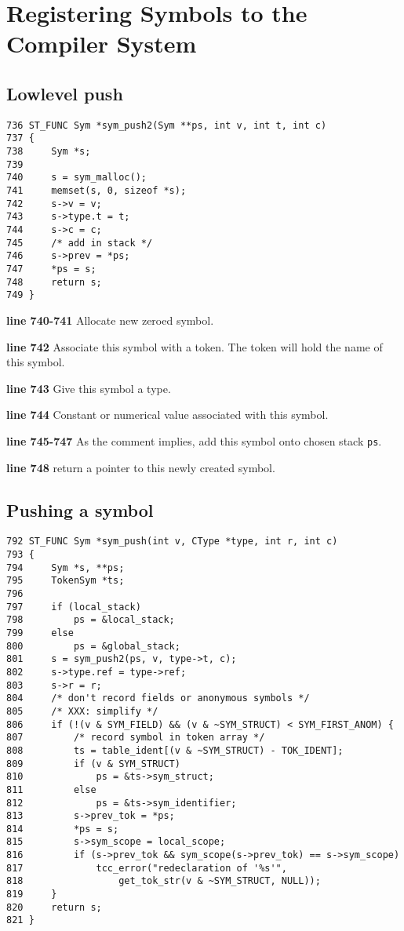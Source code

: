 \section{Registering Symbols to the Compiler System}

\subsection{Lowlevel push}
\begin{verbatim}
736 ST_FUNC Sym *sym_push2(Sym **ps, int v, int t, int c)
737 {
738     Sym *s;
739
740     s = sym_malloc();
741     memset(s, 0, sizeof *s);
742     s->v = v;
743     s->type.t = t;
744     s->c = c;
745     /* add in stack */
746     s->prev = *ps;
747     *ps = s;
748     return s;
749 }
\end{verbatim}
\begin{tcc_desc}
\textbf{line 740-741} Allocate new zeroed symbol. 

\textbf{line 742} Associate this symbol with a token. The token will hold the name of this symbol.

\textbf{line 743} Give this symbol a type.

\textbf{line 744} Constant or numerical value associated with this symbol.

\textbf{line 745-747} As the comment implies, add this symbol onto chosen stack \verb|ps|.

\textbf{line 748} return a pointer to this newly created symbol.
\end{tcc_desc}

\subsection{Pushing a symbol}

\begin{verbatim}
792 ST_FUNC Sym *sym_push(int v, CType *type, int r, int c)
793 {
794     Sym *s, **ps;
795     TokenSym *ts;
796
797     if (local_stack)
798         ps = &local_stack;
799     else
800         ps = &global_stack;
801     s = sym_push2(ps, v, type->t, c);
802     s->type.ref = type->ref;
803     s->r = r;
804     /* don't record fields or anonymous symbols */
805     /* XXX: simplify */
806     if (!(v & SYM_FIELD) && (v & ~SYM_STRUCT) < SYM_FIRST_ANOM) {
807         /* record symbol in token array */
808         ts = table_ident[(v & ~SYM_STRUCT) - TOK_IDENT];
809         if (v & SYM_STRUCT)
810             ps = &ts->sym_struct;
811         else
812             ps = &ts->sym_identifier;
813         s->prev_tok = *ps;
814         *ps = s;
815         s->sym_scope = local_scope;
816         if (s->prev_tok && sym_scope(s->prev_tok) == s->sym_scope)
817             tcc_error("redeclaration of '%s'",
818                 get_tok_str(v & ~SYM_STRUCT, NULL));
819     }
820     return s;
821 }
\end{verbatim}

